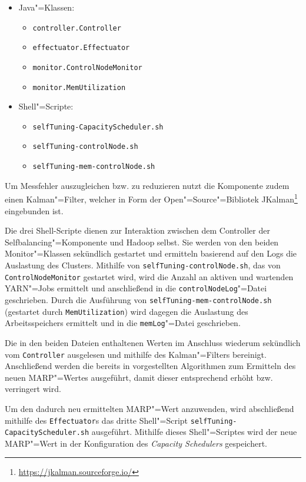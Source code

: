 \begin{itemize}
    \item Java"=Klassen:
    \begin{itemize}
        \item \texttt{controller.Controller}
        \item \texttt{effectuator.Effectuator}
        \item \texttt{monitor.ControlNodeMonitor}
        \item \texttt{monitor.MemUtilization}
    \end{itemize}
    \item Shell"=Scripte:
    \begin{itemize}
        \item \texttt{selfTuning-CapacityScheduler.sh}
        \item \texttt{selfTuning-controlNode.sh}
        \item \texttt{selfTuning-mem-controlNode.sh}
    \end{itemize}
\end{itemize}

Um Messfehler auszugleichen bzw. zu reduzieren nutzt die Komponente zudem einen Kalman"=Filter, welcher in Form der Open"=Source"=Bibliotek JKalman\footnote{\url{https://jkalman.sourceforge.io/}} eingebunden ist.

Die drei Shell-Scripte dienen zur Interaktion zwischen dem Controller der Selfbalancing"=Komponente und Hadoop selbst.
Sie werden von den beiden Monitor"=Klassen sekündlich gestartet und ermitteln basierend auf den Logs die Auslastung des Clusters.
Mithilfe von \texttt{selfTuning-controlNode.sh}, das von \texttt{ControlNodeMonitor} gestartet wird, wird die Anzahl an aktiven und wartenden YARN"=Jobs ermittelt und anschließend in die \texttt{controlNodeLog}"=Datei geschrieben.
Durch die Ausführung von \texttt{selfTuning-mem-controlNode.sh} (gestartet durch \texttt{MemUtilization}) wird dagegen die Auslastung des Arbeitsspeichers ermittelt und in die \texttt{memLog}"=Datei geschrieben.

Die in den beiden Dateien enthaltenen Werten im Anschluss wiederum sekündlich vom \texttt{Controller} ausgelesen und mithilfe des Kalman"=Filters bereinigt.
Anschließend werden die bereits in \cite{zhang2016} vorgestellten Algorithmen zum Ermitteln des neuen \ac{MARP}"=Wertes ausgeführt, damit dieser entsprechend erhöht bzw. verringert wird.

Um den dadurch neu ermittelten \ac{MARP}"=Wert anzuwenden, wird abschließend mithilfe des \texttt{Effectuator}s das dritte Shell"=Script \texttt{selfTuning-CapacityScheduler.sh} ausgeführt.
Mithilfe dieses Shell"=Scriptes wird der neue MARP"=Wert in der Konfiguration des \emph{Capacity Schedulers} gespeichert.
